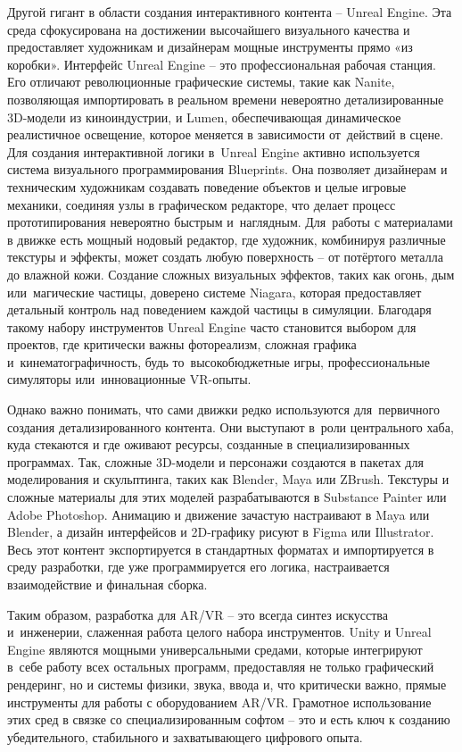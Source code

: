 \documentclass{ou}
\begin{document}
Другой гигант в области создания интерактивного контента -- Unreal Engine. Эта среда сфокусирована на достижении высочайшего визуального качества и предоставляет художникам и дизайнерам мощные инструменты прямо «из коробки». Интерфейс Unreal Engine -- это профессиональная рабочая станция. Его отличают революционные графические системы, такие как Nanite, позволяющая импортировать в реальном времени невероятно детализированные 3D-модели из киноиндустрии, и Lumen, обеспечивающая динамическое реалистичное освещение, которое меняется в зависимости от~действий в сцене. Для создания интерактивной логики в~Unreal Engine активно используется система визуального программирования Blueprints. Она позволяет дизайнерам и техническим художникам создавать поведение объектов и целые игровые механики, соединяя узлы в графическом редакторе, что делает процесс прототипирования невероятно быстрым и~наглядным. Для~работы с материалами в движке есть мощный нодовый редактор, где художник, комбинируя различные текстуры и эффекты, может создать любую поверхность -- от потёртого металла до влажной кожи. Создание сложных визуальных эффектов, таких как огонь, дым или~магические частицы, доверено системе Niagara, которая предоставляет детальный контроль над поведением каждой частицы в симуляции. Благодаря такому набору инструментов Unreal Engine часто становится выбором для проектов, где критически важны фотореализм, сложная графика и~кинематографичность, будь то~высокобюджетные игры, профессиональные симуляторы или~инновационные VR-опыты.

Однако важно понимать, что сами движки редко используются для~первичного создания детализированного контента. Они выступают в~роли центрального хаба, куда стекаются и где оживают ресурсы, созданные в специализированных программах. Так, сложные 3D-модели и персонажи создаются в пакетах для моделирования и скульптинга, таких как Blender, Maya или ZBrush. Текстуры и сложные материалы для этих моделей разрабатываются в Substance Painter или Adobe Photoshop. Анимацию и движение зачастую настраивают в Maya или Blender, а дизайн интерфейсов и 2D-графику рисуют в Figma или Illustrator. Весь этот контент экспортируется в стандартных форматах и импортируется в среду разработки, где уже программируется его логика, настраивается взаимодействие и финальная сборка.

Таким образом, разработка для AR/VR -- это всегда синтез искусства и~инженерии, слаженная работа целого набора инструментов. Unity и Unreal Engine являются мощными универсальными средами, которые интегрируют в~себе работу всех остальных программ, предоставляя не только графический рендеринг, но и системы физики, звука, ввода и, что критически важно, прямые инструменты для работы с оборудованием AR/VR. Грамотное использование этих сред в связке со специализированным софтом -- это и есть ключ к созданию убедительного, стабильного и захватывающего цифрового опыта.
\newpage
\end{document}
